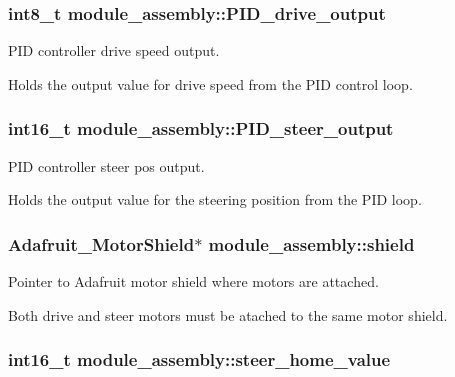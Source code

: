 \subsubsection[{P\+I\+D\+\_\+drive\+\_\+output}]{\setlength{\rightskip}{0pt plus 5cm}int8\+\_\+t module\+\_\+assembly\+::\+P\+I\+D\+\_\+drive\+\_\+output}\label{structmodule__assembly_a987ebb08eef885c780ce16cb747ad4b8}


P\+I\+D controller drive speed output. 

Holds the output value for drive speed from the P\+I\+D control loop. \hypertarget{structmodule__assembly_a4acd38bec79f8a8afcd4c4ec357569da}{}
\subsubsection[{P\+I\+D\+\_\+steer\+\_\+output}]{\setlength{\rightskip}{0pt plus 5cm}int16\+\_\+t module\+\_\+assembly\+::\+P\+I\+D\+\_\+steer\+\_\+output}\label{structmodule__assembly_a4acd38bec79f8a8afcd4c4ec357569da}


P\+I\+D controller steer pos output. 

Holds the output value for the steering position from the P\+I\+D loop. \hypertarget{structmodule__assembly_a803c57702021d99f89c3b393aabf3a50}{}
\subsubsection[{shield}]{\setlength{\rightskip}{0pt plus 5cm}Adafruit\+\_\+\+Motor\+Shield$\ast$ module\+\_\+assembly\+::shield}\label{structmodule__assembly_a803c57702021d99f89c3b393aabf3a50}


Pointer to Adafruit motor shield where motors are attached. 

Both drive and steer motors must be atached to the same motor shield. \hypertarget{structmodule__assembly_a47838ac5150269f7889f38e62027fd23}{}
\subsubsection[{steer\+\_\+home\+\_\+value}]{\setlength{\rightskip}{0pt plus 5cm}int16\+\_\+t module\+\_\+assembly\+::steer\+\_\+home\+\_\+value}\label{structmodule__assembly_a47838ac5150269f7889f38e62027fd23}


